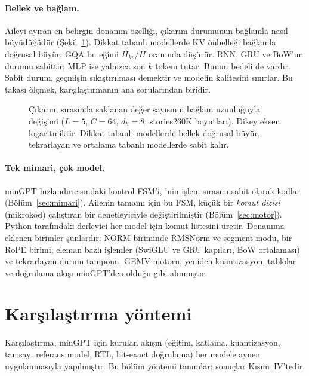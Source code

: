 \paragraph{Bellek ve bağlam.} Aileyi ayıran en belirgin donanım özelliği, çıkarım durumunun bağlamla nasıl büyüdüğüdür (Şekil~\ref{fig:bellek}). Dikkat tabanlı modellerde KV önbelleği bağlamla doğrusal büyür; GQA bu eğimi $H_{kv}/H$ oranında düşürür. RNN, GRU ve BoW'un durumu sabittir; MLP ise yalnızca son $k$ tokenı tutar. Bunun bedeli de vardır. Sabit durum, geçmişin sıkıştırılması demektir ve modelin kalitesini sınırlar. Bu takası ölçmek, karşılaştırmanın ana sorularından biridir.

\begin{figure}[h]
  \centering
  \caption[Çıkarım durum belleği ve bağlam]{Çıkarım sırasında saklanan değer sayısının bağlam uzunluğuyla değişimi ($L=5$, $C=64$, $d_h=8$; stories260K boyutları). Dikey eksen logaritmiktir. Dikkat tabanlı modellerde bellek doğrusal büyür, tekrarlayan ve ortalama tabanlı modellerde sabit kalır.}
  \label{fig:bellek}
\end{figure}

\paragraph{Tek mimari, çok model.} minGPT hızlandırıcısındaki kontrol FSM'i, 'nin işlem sırasını sabit olarak kodlar (Bölüm~\ref{sec:mimari}). Ailenin tamamı için bu FSM, küçük bir \emph{komut dizisi} (mikrokod) çalıştıran bir denetleyiciyle değiştirilmiştir (Bölüm~\ref{sec:motor}). Python tarafındaki derleyici her model için komut listesini üretir. Donanıma eklenen birimler şunlardır: NORM biriminde RMSNorm ve segment modu, bir RoPE birimi, eleman bazlı işlemler (SwiGLU ve GRU kapıları, BoW ortalaması) ve tekrarlayan durum tamponu. GEMV motoru, yeniden kuantizasyon, tablolar ve doğrulama akışı minGPT'den olduğu gibi alınmıştır.

\section{Karşılaştırma yöntemi}\label{sec:yontem}

Karşılaştırma, minGPT için kurulan akışın (eğitim, katlama, kuantizasyon, tamsayı referans model, RTL, bit-exact doğrulama) her modele aynen uygulanmasıyla yapılmıştır. Bu bölüm yöntemi tanımlar; sonuçlar Kısım~IV'tedir.

